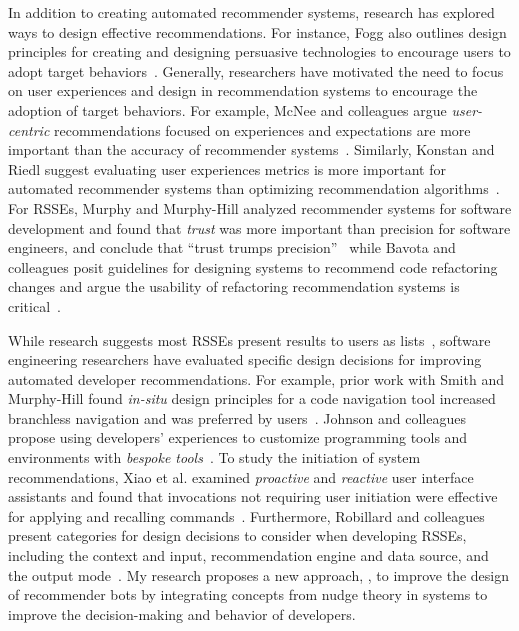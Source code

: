 In addition to creating automated recommender systems, research has explored ways to design effective recommendations. For instance, Fogg also outlines design principles for creating and designing persuasive technologies to encourage users to adopt target behaviors~\cite{Fogg2009Persuasive}. Generally, researchers have motivated the need to focus on user experiences and design in recommendation systems to encourage the adoption of target behaviors. For example, McNee and colleagues argue \textit{user-centric} recommendations focused on experiences and expectations are more important than the accuracy of recommender systems~\cite{McNee2006Accuracy}. Similarly, Konstan and Riedl suggest evaluating user experiences metrics is more important for automated recommender systems than optimizing recommendation algorithms~\cite{konstan2012recommender}. For RSSEs, Murphy and Murphy-Hill analyzed recommender systems for software development and found that \textit{trust} was more important than precision for software engineers, and conclude that ``trust trumps precision''~\cite{murphy2010trust} while Bavota and colleagues posit guidelines for designing systems to recommend code refactoring changes and argue the usability of refactoring recommendation systems is critical~\cite{Bavota2014RefactoringRSSE}.

While research suggests most RSSEs present results to users as lists~\cite{Gasparic16RSSEReview}, software engineering researchers have evaluated specific design decisions for improving automated developer recommendations. For example, prior work with Smith and Murphy-Hill found \textit{in-situ} design principles for a code navigation tool increased branchless navigation and was preferred by users~\cite{Flower}. Johnson and colleagues propose using developers' experiences to customize programming tools and environments with \textit{bespoke tools}~\cite{Johnson15Bespoke}. To study the initiation of system recommendations, Xiao et al. examined \textit{proactive} and \textit{reactive} user interface assistants and found that invocations not requiring user initiation were effective for applying and recalling commands~\cite{xiao2003quiet}. Furthermore, Robillard and colleagues present categories for design decisions to consider when developing RSSEs, including the context and input, recommendation engine and data source, and the output mode~\cite{RSSE}. My research proposes a new approach, \framework, to improve the design of recommender bots by integrating concepts from nudge theory in systems to improve the decision-making and behavior of developers.

